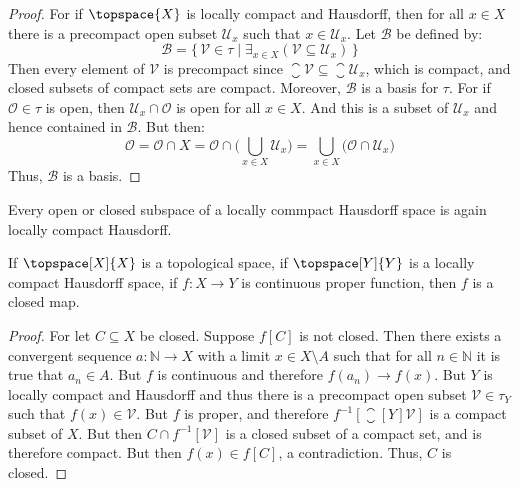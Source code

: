 \documentclass{article}                                                        %
\begin{document}
        \begin{proof}
            For if $\topspace{X}$ is locally compact and Hausdorff, then for all
            $x\in{X}$ there is a precompact open subset $\mathcal{U}_{x}$
            such that $x\in\mathcal{U}_{x}$. Let $\mathcal{B}$ be defined by:
            \begin{equation}
                \mathcal{B}=\{\,\mathcal{V}\in\tau\;|\;
                    \exists_{x\in{X}}(\mathcal{V}\subseteq\mathcal{U}_{x})\,\}
            \end{equation}
            Then every element of $\mathcal{V}$ is precompact since
            $\closure{\mathcal{V}}\subseteq\closure{\mathcal{U}_{x}}$, which
            is compact, and closed subsets of compact sets are compact.
            Moreover, $\mathcal{B}$ is a basis for $\tau$. For if
            $\mathcal{O}\in\tau$ is open, then $\mathcal{U}_{x}\cap\mathcal{O}$
            is open for all $x\in{X}$. And this is a subset of $\mathcal{U}_{x}$
            and hence contained in $\mathcal{B}$. But then:
            \begin{equation}
                \mathcal{O}=\mathcal{O}\cap{X}
                =\mathcal{O}\cap\Big(\bigcup_{x\in{X}}\mathcal{U}_{x}\Big)
                =\bigcup_{x\in{X}}\big(\mathcal{O}\cap\mathcal{U}_{x}\big)
            \end{equation}
            Thus, $\mathcal{B}$ is a basis.
        \end{proof}
        \begin{theorem}
            Every open or closed subspace of a locally commpact Hausdorff space
            is again locally compact Hausdorff.
        \end{theorem}
        \begin{theorem}
            If $\topspace[X]{X}$ is a topological space, if $\topspace[Y]{Y}$ is
            a locally compact Hausdorff space, if $f:X\rightarrow{Y}$ is
            continuous proper function, then $f$ is a closed map.
        \end{theorem}
        \begin{proof}
            For let $C\subseteq{X}$ be closed. Suppose $f[C]$ is not closed.
            Then there exists a convergent sequence $a:\mathbb{N}\rightarrow{X}$
            with a limit $x\in{X}\setminus{A}$ such that for all
            $n\in\mathbb{N}$ it is true that $a_{n}\in{A}$. But $f$ is
            continuous and therefore $f(a_{n})\rightarrow{f}(x)$. But
            $Y$ is locally compact and Hausdorff and thus there is a precompact
            open subset $\mathcal{V}\in\tau_{Y}$ such that $f(x)\in\mathcal{V}$.
            But $f$ is proper, and therefore
            $f^{\minus{1}}[\closure[Y]{\mathcal{V}}]$ is a compact subset of
            $X$. But then $C\cap{f}^{\minus{1}}[\mathcal{V}]$ is a closed
            subset of a compact set, and is therefore compact. But then
            $f(x)\in{f}[C]$, a contradiction. Thus, $C$ is closed.
        \end{proof}
\end{document}
